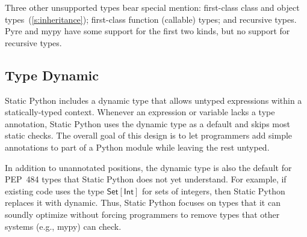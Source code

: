 \documentclass[english,cleveref,submission]{programming}
\newcommand{\SP}{Static Python}
\newcommand{\PEP}{PEP~484}
\newcommand{\typefont}[1]{\mathsf{#1}}
\newcommand{\paramtype}[2]{#1[#2]}
\newcommand{\sptint}{\typefont{Int}}
\newcommand{\sptset}[1]{\paramtype{\typefont{Set}}{#1}}
\begin{document}
Three other unsupported types bear special mention:
first-class class and object types~(\cref{s:inheritance});
first-class function (callable) types; and
recursive types.
Pyre and mypy have some support for the first two kinds, but no support for recursive types.


\subsection{Type Dynamic}
\label{s:type-dynamic}

\SP{} includes a dynamic type that allows untyped expressions within a
statically-typed context.
Whenever an expression or variable lacks a type annotation, \SP{} uses the
dynamic type as a default and skips most static checks.
The overall goal of this design is to let programmers add simple annotations to
part of a Python module while leaving the rest untyped.

In addition to unannotated positions, the dynamic type is also the default for
\PEP{} types that \SP{} does not yet understand.
For example, if existing code uses the type $\sptset{\sptint}$ for sets of integers,
then \SP{} replaces it with dynamic.
Thus, \SP{} focuses on types that it can soundly optimize without forcing
programmers to remove types that other systems (e.g., mypy) can check.
\end{document}
